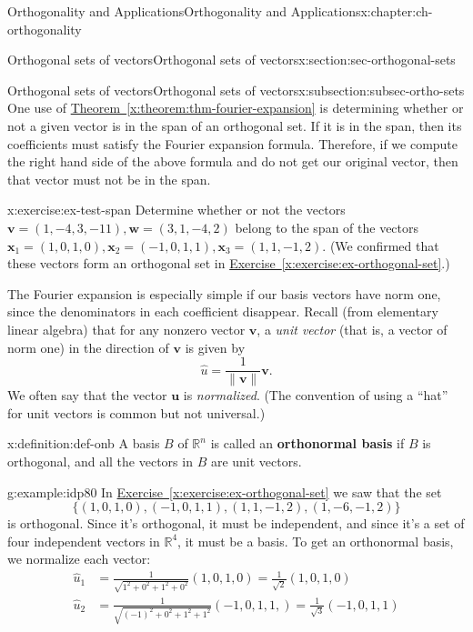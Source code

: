 \documentclass[oneside,10pt,]{book}
\newcommand{\xreffont}{\relax}
\newcommand{\terminology}[1]{\textbf{#1}}
\numberwithin{equation}{section}
\newcommand{\R}{\mathbb{R}}
\newcommand{\len}[1]{\lVert #1\rVert}
\newcommand{\uu}{\mathbf{u}}
\newcommand{\vv}{\mathbf{v}}
\newcommand{\ww}{\mathbf{w}}
\newcommand{\xx}{\mathbf{x}}
\newcommand{\amp}{&}
\begin{document}
\begin{chapterptx}{Orthogonality and Applications}{}{Orthogonality and Applications}{}{}{x:chapter:ch-orthogonality}
\begin{sectionptx}{Orthogonal sets of vectors}{}{Orthogonal sets of vectors}{}{}{x:section:sec-orthogonal-sets}
\begin{subsectionptx}{Orthogonal sets of vectors}{}{Orthogonal sets of vectors}{}{}{x:subsection:subsec-ortho-sets}
One use of \hyperref[x:theorem:thm-fourier-expansion]{Theorem~{\xreffont\ref{x:theorem:thm-fourier-expansion}}} is determining whether or not a given vector is in the span of an orthogonal set. If it is in the span, then its coefficients must satisfy the Fourier expansion formula. Therefore, if we compute the right hand side of the above formula and do not get our original vector, then that vector must not be in the span.%
\begin{inlineexercise}{}{x:exercise:ex-test-span}%
Determine whether or not the vectors \(\vv=(1,-4,3,-11), \ww=(3,1,-4,2)\) belong to the span of the vectors \(\xx_1=(1,0,1,0), \xx_2=(-1,0,1,1), \xx_3=(1,1,-1,2)\). (We confirmed that these vectors form an orthogonal set in \hyperref[x:exercise:ex-orthogonal-set]{Exercise~{\xreffont\ref{x:exercise:ex-orthogonal-set}}}.)%
\end{inlineexercise}%
The Fourier expansion is especially simple if our basis vectors have norm one, since the denominators in each coefficient disappear. Recall (from elementary linear algebra) that for any nonzero vector \(\vv\), a \emph{unit vector} (that is, a vector of norm one) in the direction of \(\vv\) is given by%
\begin{equation*}
\hat{u} = \frac{1}{\len{\vv}}\vv\text{.}
\end{equation*}
We often say that the vector \(\uu\) is \emph{normalized}. (The convention of using a ``hat'' for unit vectors is common but not universal.)%
\begin{definition}{}{x:definition:def-onb}%
A basis \(B\) of \(\R^n\) is called an \terminology{orthonormal basis} if \(B\) is orthogonal, and all the vectors in \(B\) are unit vectors.%
\end{definition}
\begin{example}{}{g:example:idp80}%
In \hyperref[x:exercise:ex-orthogonal-set]{Exercise~{\xreffont\ref{x:exercise:ex-orthogonal-set}}} we saw that the set%
\begin{equation*}
\{(1,0,1,0), (-1,0,1,1), (1,1,-1,2),(1,-6,-1,2)\}
\end{equation*}
is orthogonal. Since it's orthogonal, it must be independent, and since it's a set of four independent vectors in \(\R^4\), it must be a basis. To get an orthonormal basis, we normalize each vector:%
\begin{align*}
\hat{u}_1 \amp = \frac{1}{\sqrt{1^2+0^2+1^2+0^2}}(1,0,1,0) = \frac{1}{\sqrt{2}}(1,0,1,0)\\
\hat{u}_2 \amp = \frac{1}{\sqrt{(-1)^2+0^2+1^2+1^2}}(-1,0,1,1,) = \frac{1}{\sqrt{3}}(-1,0,1,1)\\

\end{align*}
\end{example}
\end{subsectionptx}
\end{sectionptx}
\end{chapterptx}
\end{document}
